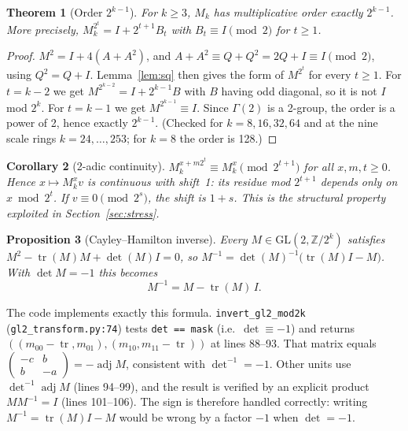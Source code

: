 \documentclass[11pt]{article}
\newtheorem{theorem}{Theorem}[section]
\newtheorem{proposition}[theorem]{Proposition}
\newtheorem{corollary}[theorem]{Corollary}
\theoremstyle{definition}
\newcommand{\Z}{\mathbb{Z}}
\newcommand{\GL}{\mathrm{GL}}
\newcommand{\tr}{\operatorname{tr}}
\newcommand{\code}[1]{\texttt{\small #1}}
\begin{document}
\begin{theorem}[Order $2^{k-1}$]\label{thm:order}
For $k\ge3$, $M_k$ has multiplicative order exactly $2^{k-1}$. More precisely, $M_k^{2^t}=I+2^{t+1}B_t$ with
$B_t\equiv I\pmod2$ for $t\ge1$.
\end{theorem}
\begin{proof}
$M^2=I+4(A+A^2)$, and $A+A^2\equiv Q+Q^2=2Q+I\equiv I\pmod 2$, using $Q^2=Q+I$. Lemma~\ref{lem:sq} then gives the
form of $M^{2^t}$ for every $t\ge1$. For $t=k-2$ we get $M^{2^{k-2}}=I+2^{k-1}B$ with $B$ having odd diagonal, so it
is not $I$ mod $2^k$. For $t=k-1$ we get $M^{2^{k-1}}\equiv I$. Since $\Gamma(2)$ is a 2-group, the order is a power
of 2, hence exactly $2^{k-1}$. (Checked for $k=8,16,32,64$ and at the nine scale rings $k=24,\dots,253$; for $k=8$ the order is 128.)
\end{proof}

\begin{corollary}[2-adic continuity]\label{cor:cont}
$M_k^{x+m2^t}\equiv M_k^x\pmod{2^{t+1}}$ for all $x,m,t\ge0$. Hence $x\mapsto M_k^x v$ is continuous with shift~1: its
residue mod $2^{t+1}$ depends only on $x\bmod2^t$. If $v\equiv0\pmod{2^s}$, the shift is $1+s$. This is the
structural property exploited in Section~\ref{sec:stress}.
\end{corollary}

\begin{proposition}[Cayley--Hamilton inverse]\label{prop:ch}
Every $M\in\GL(2,\Z/2^k)$ satisfies $M^2-\tr(M)M+\det(M)I=0$, so $M^{-1}=\det(M)^{-1}\bigl(\tr(M)I-M\bigr)$.
With $\det M=-1$ this becomes
\[ M^{-1}=M-\tr(M)\,I. \]
\end{proposition}
The code implements exactly this formula. \code{invert\_gl2\_mod2k} (\code{gl2\_transform.py:74}) tests
\code{det == mask} (i.e.\ $\det\equiv-1$) and returns $((m_{00}-\tr,m_{01}),(m_{10},m_{11}-\tr))$ at lines 88--93.
That matrix equals $\begin{pmatrix}-c&b\\b&-a\end{pmatrix}=-\operatorname{adj}M$, consistent with $\det^{-1}=-1$.
Other units use $\det^{-1}\operatorname{adj}M$ (lines 94--99), and the result is verified by an explicit product
$MM^{-1}=I$ (lines 101--106). The sign is therefore handled correctly: writing $M^{-1}=\tr(M)I-M$ would be wrong by a
factor $-1$ when $\det=-1$.
\end{document}
